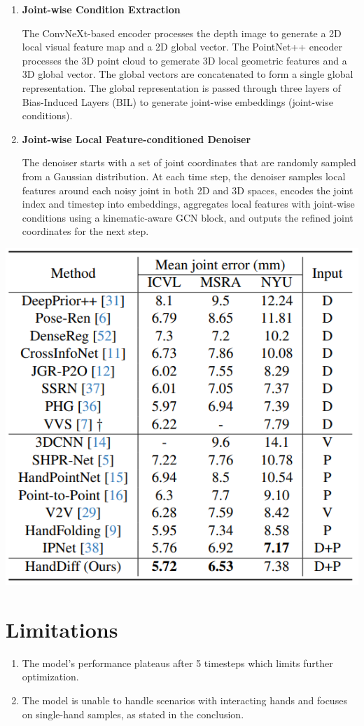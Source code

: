\documentclass{article}
\begin{document}
\begin{enumerate}
    \item \textbf{Joint-wise Condition Extraction}
    
    The ConvNeXt-based encoder processes the depth image to generate a 2D local visual feature map and a 2D global vector. The PointNet++ encoder processes the 3D point cloud to gemerate 3D local geometric features and a 3D global vector. The global vectors are concatenated to form a single global representation. The global representation is passed through three layers of Bias-Induced Layers (BIL) to generate joint-wise embeddings (joint-wise conditions).

    \item \textbf{Joint-wise Local Feature-conditioned Denoiser}
    
    The denoiser starts with a set of joint coordinates that are randomly sampled from a Gaussian distribution. At each time step, the denoiser samples local features around each noisy joint in both 2D and 3D spaces, encodes the joint index and timestep into embeddings, aggregates local features with joint-wise conditions using a kinematic-aware GCN block, and outputs the refined joint coordinates for the next step.
\end{enumerate}

\begin{center}
    \includegraphics[scale=0.4]{handdiff-2.png}
\end{center}

\section*{Limitations}

\begin{enumerate}
    \item The model's performance plateaus after 5 timesteps which limits further optimization.
    \item The model is unable to handle scenarios with interacting hands and focuses on single-hand samples, as stated in the conclusion.
\end{enumerate}
\end{document}
